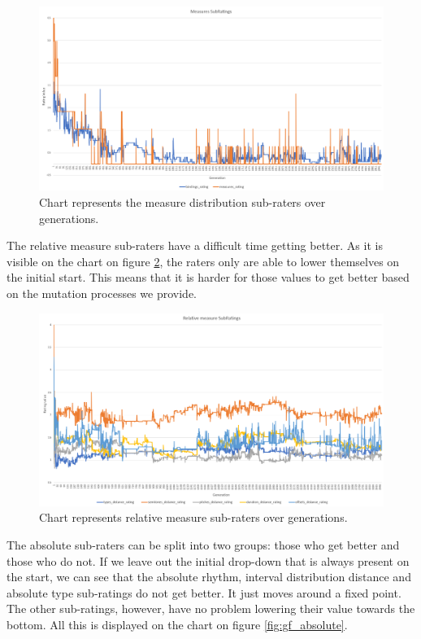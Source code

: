 \documentclass[a4paper]{article}
\begin{document}
\begin{figure}[H]
	\advance\leftskip-1.5cm
	\includegraphics[width=1.2\textwidth]{Fotos/results/gf/measures_rating_graph.png}
	\caption{Chart represents the measure distribution sub-raters over generations.}
	\label{fig:gf_measures}
\end{figure}

The relative measure sub-raters have a difficult time getting better. As it is visible on the chart on figure \ref{fig:gf_relm}, the raters only are able to lower themselves on the initial start. This means that it is harder for those values to get better based on the mutation processes we provide.


\begin{figure}[H]
	\advance\leftskip-1.5cm
	\includegraphics[width=1.2\textwidth]{Fotos/results/gf/rel_measures_rating_graph.png}
	\caption{Chart represents relative measure sub-raters over generations.}
	\label{fig:gf_relm}
\end{figure}

The absolute sub-raters can be split into two groups: those who get better and those who do not. If we leave out the initial drop-down that is always present on the start, we can see that the absolute rhythm, interval distribution distance and absolute type sub-ratings do not get better. It just moves around a fixed point. The other sub-ratings, however, have no problem lowering their value towards the bottom. All this is displayed on the chart on figure \ref{fig:gf_absolute}.
\end{document}
